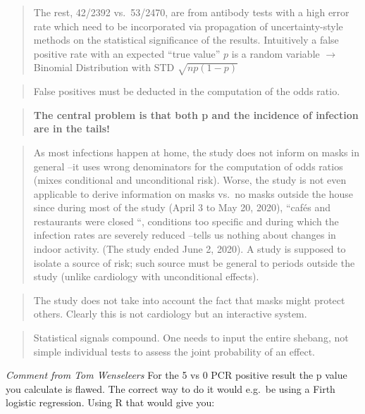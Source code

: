 \documentclass[
]{book}
\begin{document}
\begin{quote}
The rest, 42/2392 vs.~53/2470, are from antibody tests with a high error rate
which need to be incorporated via propagation of uncertainty-style methods
on the statistical significance of the results.
Intuitively a false positive rate with an expected ``true value'' \(p\)
is a random variable \(\rightarrow\) Binomial Distribution with STD \(\sqrt{n p (1-p)}\)
\end{quote}

\begin{quote}
False positives must be deducted in the computation of the odds ratio.
\end{quote}

\begin{quote}
\textbf{The central problem is that both p and the incidence of infection are in the tails!}
\end{quote}

\begin{quote}
As most infections happen at home, the study does not inform on masks in general --it uses wrong denominators for the computation of odds ratios (mixes conditional and unconditional risk). Worse, the study is not even applicable to derive information on masks vs.~no masks outside the house since during most of the study (April 3 to May 20, 2020), ``cafés and restaurants were closed ``, conditions too specific and during which the infection rates are severely reduced --tells us nothing about changes in indoor activity. (The study ended June 2, 2020). A study is supposed to isolate a source of risk; such source must be general to periods outside the study (unlike cardiology with unconditional effects).
\end{quote}

\begin{quote}
The study does not take into account the fact that masks might protect others. Clearly this is not cardiology but an interactive system.
\end{quote}

\begin{quote}
Statistical signals compound. One needs to input the entire shebang, not simple individual tests to assess the joint probability of an effect.
\end{quote}

\emph{Comment from Tom Wenseleers}
For the 5 vs 0 PCR positive result the p value you calculate is flawed. The correct way to do it would e.g.~be using a Firth logistic regression. Using R that would give you:
\end{document}
